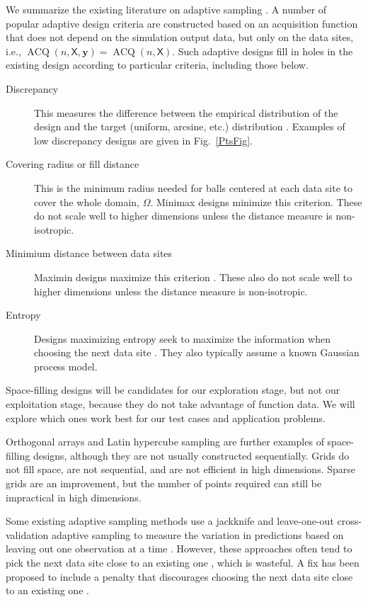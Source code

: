 \documentclass[11pt]{NSFamsart}
\DeclareMathOperator{\VAL}{ACQ}
\newcommand{\mX}{\mathsf{X}}
\newcommand{\by}{{\boldsymbol{y}}}
\begin{document}
We summarize the existing literature on adaptive sampling \cite{aute2013cross,burnaev2015adaptive,fu2017adaptive,gramacy2008adaptive,jin2002sequential,kleijnen2004application}. A number of popular adaptive design criteria are constructed based on an acquisition function that does not depend on the simulation output data, but only on the data sites, i.e., $\VAL(n,\mX,\by) = \VAL(n,\mX)$. Such adaptive designs fill in holes in the existing design according to particular criteria, including those below. 
\begin{description}
\item[Discrepancy] This measures the difference between the empirical distribution of the design and the target (uniform, arcsine, etc.) distribution \cite{FangEtal19a}. Examples of low discrepancy designs are given in Fig.\ \ref{PtsFig}. 
\item[Covering radius or fill distance] This is the minimum radius needed for balls centered at each data site to cover the whole domain, $\Omega$. Minimax designs minimize this criterion.  These do not scale well to higher dimensions unless the distance measure is non-isotropic.
\item[Minimium distance between data sites] Maximin designs maximize this criterion \cite{jin2002sequential}.  These also do not scale well to higher dimensions unless the distance measure is non-isotropic.
\item[Entropy] Designs maximizing entropy seek to maximize the information when choosing the next data site \cite{jin2002sequential}. They also typically assume a known Gaussian process model.
\end{description}
Space-filling designs will be candidates for our exploration stage, but not our exploitation stage, because they do not take advantage of function data.  We will explore which ones work best for our test cases and application problems.

Orthogonal arrays and Latin hypercube sampling are further examples of space-filling designs, although they are not usually constructed sequentially. Grids do not fill space, are not sequential, and are not efficient in high dimensions.  Sparse grids \cite{BunGrie04a} are an improvement, but the number of points required can still be impractical in high dimensions.  

Some existing adaptive sampling methods use a jackknife and leave-one-out cross-validation adaptive sampling to measure the variation in predictions based on leaving out one observation at a time \cite{aute2013cross,jin2002sequential, kleijnen2004application}. However, these approaches often tend to pick the next data site close to an existing one \cite{jin2002sequential}, which is wasteful. A fix has been proposed to include a penalty that discourages choosing the next data site close to an existing one \cite{aute2013cross,jin2002sequential}.
\end{document}
